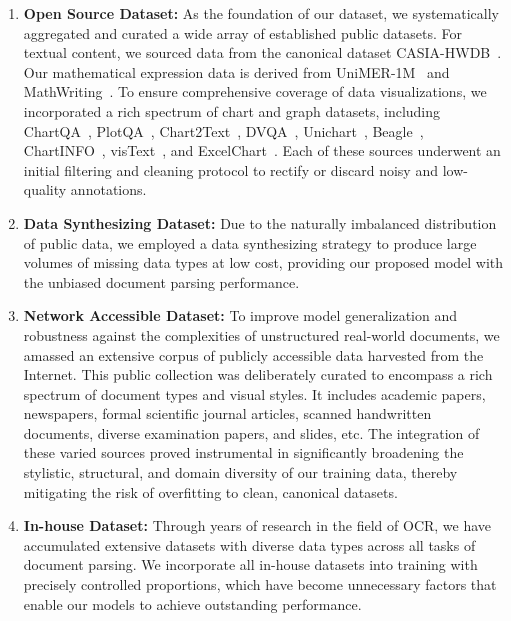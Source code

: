 \documentclass[11pt, a4paper,logo,  copyright, nonumbering]{paddleocr}
\begin{document}
\begin{enumerate}[label=\arabic*.]
     \item \textbf{Open Source Dataset:} As the foundation of our dataset, we systematically aggregated and curated a wide array of established public datasets. For textual content, we sourced data from the canonical dataset CASIA-HWDB~\cite{liu2011casia}. Our mathematical expression data is derived from UniMER-1M~\cite{unimernet} and MathWriting~\cite{MathWriting}. To ensure comprehensive coverage of data visualizations, we incorporated a rich spectrum of chart and graph datasets, including ChartQA~\cite{chartqa}, PlotQA~\cite{plotqa}, Chart2Text~\cite{chart2text}, DVQA~\cite{dvqa}, Unichart~\cite{masry2023unichart}, Beagle~\cite{beagle}, ChartINFO~\cite{chartinfo}, visText~\cite{tang2023vistext}, and ExcelChart~\cite{excelchart}. Each of these sources underwent an initial filtering and cleaning protocol to rectify or discard noisy and low-quality annotations.
    \item \textbf{Data Synthesizing Dataset:}  Due to the naturally imbalanced distribution of public data, we employed a data synthesizing strategy to produce large volumes of missing data types at low cost, providing our proposed model with the unbiased document parsing performance.
    \item \textbf{Network Accessible Dataset:}  To improve model generalization and robustness against the complexities of unstructured real-world documents, we amassed an extensive corpus of publicly accessible data harvested from the Internet. This public collection was deliberately curated to encompass a rich spectrum of document types and visual styles. It includes academic papers, newspapers, formal scientific journal articles, scanned handwritten documents, diverse examination papers, and slides, etc. The integration of these varied sources proved instrumental in significantly broadening the stylistic, structural, and domain diversity of our training data, thereby mitigating the risk of overfitting to clean, canonical datasets.
    \item \textbf{In-house Dataset:} Through years of research in the field of OCR, we have accumulated extensive datasets with diverse data types across all tasks of document parsing. We incorporate all in-house datasets into training with precisely controlled proportions, which have become unnecessary factors that enable our models to achieve outstanding performance.
\end{enumerate}
\end{document}
